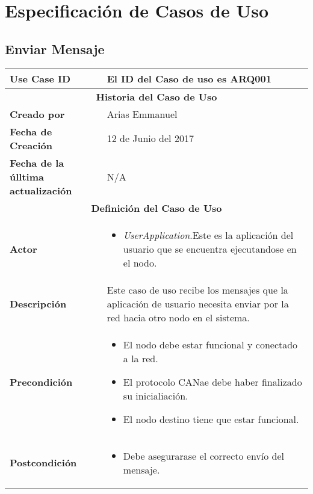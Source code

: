 \chapter{Especificación de Casos de Uso}\label{Appendix:UseCase}



\section{Enviar Mensaje}

\begin{longtable}{|p{5cm}|p{8cm}|}
  \hline
  \textbf{Use Case ID} & El ID del Caso de uso es ARQ001 \\ \hline
  \multicolumn{2}{|c|}{\Large\textbf{Historia del Caso de Uso}} \\ \hline
  \textbf{Creado por} & Arias Emmanuel \\ \hline
  \textbf{Fecha de Creación} & 12 de Junio del 2017 \\ \hline
  \textbf{Fecha de la úlltima actualización} & N/A \\ \hline
  \multicolumn{2}{|c|}{\Large\textbf{Definición del Caso de Uso}} \\ \hline
  \textbf{Actor} & \begin{itemize}
    \item \textit{UserApplication}.Este es la aplicación del usuario que se encuentra ejecutandose en el nodo.
  \end{itemize} \\ \hline
  \textbf{Descripción} & Este caso de uso recibe los mensajes que la aplicación de usuario necesita enviar
  por la red hacia otro nodo en el sistema. \\ \hline
  \textbf{Precondición} & \begin{itemize}
\item El nodo debe estar funcional y conectado a la red.
\item El protocolo CANae debe haber finalizado su inicialiación.
\item El nodo destino tiene que estar funcional.
  \end{itemize} \\ \hline
  \textbf{Postcondición}  & \begin{itemize}
\item Debe asegurarase el correcto envío del mensaje.

\end{itemize}
\end{longtable}

